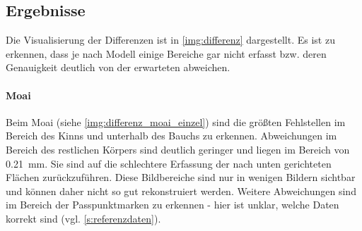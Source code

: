 \documentclass[./00PhotoBox.tex]{subfiles}
\begin{document}
\subsection{Ergebnisse}
Die Visualisierung der Differenzen ist in \autoref{img:differenz} dargestellt. Es ist zu erkennen, dass je nach Modell einige Bereiche gar nicht erfasst bzw. deren Genauigkeit deutlich von der erwarteten abweichen.

\paragraph{Moai}
Beim Moai (siehe \autoref{img:differenz_moai_einzel}) sind die größten Fehlstellen im Bereich des Kinns und unterhalb des Bauchs zu erkennen. Abweichungen im Bereich des restlichen Körpers sind deutlich geringer und liegen im Bereich von \SI{0,21}{\milli\metre}. Sie sind auf die schlechtere Erfassung der nach unten gerichteten Flächen zurückzuführen. Diese Bildbereiche sind nur in wenigen Bildern sichtbar und können daher nicht so gut rekonstruiert werden. Weitere Abweichungen sind im Bereich der Passpunktmarken zu erkennen - hier ist unklar, welche Daten korrekt sind (vgl. \autoref{s:referenzdaten}).
\end{document}
